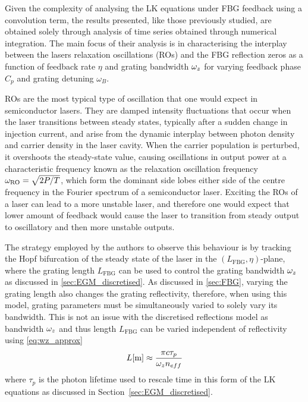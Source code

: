 Given the complexity of analysing the LK equations under FBG feedback using a convolution term, the results presented, 
like those previously studied, are obtained solely through analysis of time series obtained through numerical integration. 
The main focus of their analysis is in characterising the interplay between the lasers relaxation oscillations (ROs) and the FBG reflection zeros as a function of feedback rate $\eta$ and grating bandwidth $\omega_z$ for varying feedback phase $C_p$ and grating detuning $\omega_B$. 
%
\par
%
ROs are the most typical type of oscillation that one would expect in semiconductor lasers. 
They are damped intensity fluctuations that occur when the laser transitions between steady states, typically after a sudden change in injection current, 
and arise from the dynamic interplay between photon density and carrier density in the laser cavity. 
When the carrier population is perturbed, it overshoots the steady-state value, causing oscillations in output power at a characteristic frequency known as the relaxation oscillation frequency $\omega_\text{RO}=\sqrt{2P/T}$, 
which form the dominant side lobes either side of the centre frequency in the Fourier spectrum of a semiconductor laser. 
Exciting the ROs of a laser can lead to a more unstable laser, and therefore one would expect that lower amount of feedback would cause the laser to transition from steady output to oscillatory and then more unstable outputs. 
%
\par
%
The strategy employed by the authors to observe this behaviour is by tracking the Hopf bifurcation of the steady state of the laser in the $(L_\text{FBG},\eta)$-plane, 
where the grating length $L_\text{FBG}$ can be used to control the grating bandwidth $\omega_z$ as discussed in \ref{sec:EGM_discretised}. 
As discussed in \ref{sec:FBG}, varying the grating length also changes the grating reflectivity, therefore, when using this model, grating parameters must be simultaneously varied to solely vary its bandwidth. 
This is not an issue with the discretised reflections model as bandwidth $\omega_z$ and thus length $L_\text{FBG}$ can be varied independent of reflectivity using \ref{eq:wz_approx}
%
\begin{equation}
    L [\text{m}] \approx \frac{\pi c \tau_p}{\omega_z n_{eff}} 
\end{equation}
%
where $\tau_p$ is the photon lifetime used to rescale time in this form of the LK equations as discussed in Section~\ref{sec:EGM_discretised}.
%
\par
%
